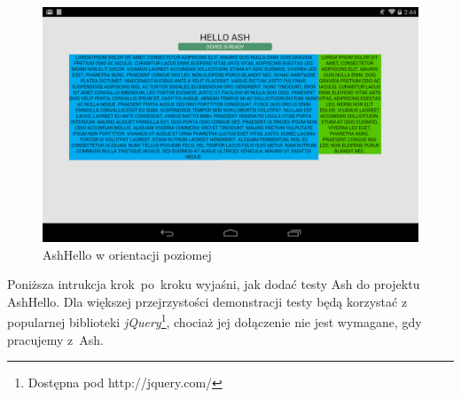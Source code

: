 \documentclass[brudnopis]{xmgr}
\begin{document}
\begin{itemize}
\begin{figure}[h]
    \centering
    \includegraphics[scale=0.25]{hello2.png}
    \caption{AshHello w orientacji poziomej}
    \label{fig:AshHello2}
\end{figure}
\end{itemize}

Poniższa intrukcja krok~po~kroku wyjaśni, jak dodać testy Ash do projektu AshHello. Dla większej przejrzystości demonstracji testy będą korzystać z popularnej biblioteki \textit{jQuery}\footnote{Dostępna pod http://jquery.com/}, chociaż jej dołączenie nie jest wymagane, gdy pracujemy z~Ash.  
\end{document}
